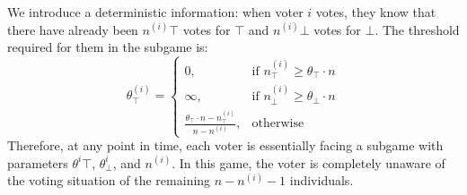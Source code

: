 \documentclass[11pt]{article}
\begin{document}
  We introduce a deterministic information: when voter $i$ votes, they know that there have already been $n^{(i)}\top$ votes for $\top$ and $n^{(i)}\bot$ votes for $\bot$. The threshold required for them in the subgame is:
  \begin{equation}
    \theta^{(i)}_\top = 
    \begin{cases}
      0, & \text{if } n^{(i)}_\top \geq \theta_\top\cdot n \\
      \infty, & \text{if } n^{(i)}_\bot \geq \theta_\bot\cdot n \\
      \frac{\theta_\top\cdot n - n^{(i)}_\top}{n - n^{(i)}}, & \text{otherwise}
    \end{cases}
  \end{equation}
  Therefore, at any point in time, each voter is essentially facing a subgame with parameters $\theta^i\top$, $\theta^i_\bot$, and $n^{(i)}$. In this game, the voter is completely unaware of the voting situation of the remaining $n-n^{(i)}-1$ individuals.
\end{document}
